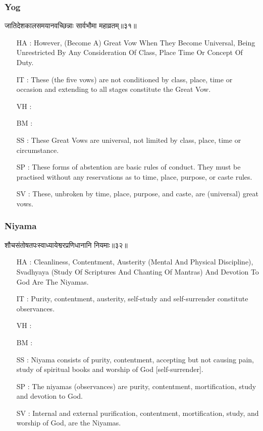 \begin{frame}[fragile]\frametitle{Yog}
\begin{sanskrit}
जातिदेशकालसमयानवच्छिन्नाः सार्वभौमा महाव्रतम्॥३१॥
\end{sanskrit}

	\begin{itemize}
	\item [HA]: However, (Become A) Great Vow When They Become Universal, Being Unrestricted By Any Consideration Of Class, Place Time Or Concept Of Duty.
	\item [IT]: These (the five vows) are not conditioned by class, place, time or occasion and extending to all stages constitute the Great Vow.
	\item [VH]: 
	\item [BM]: 
	\item [SS]: These Great Vows are universal, not limited by class, place, time or circumstance.
	\item [SP]: These forms of abstention are basic rules of conduct. They must be practised without any reservations as to time, place, purpose, or caste rules.
	\item [SV]: These, unbroken by time, place, purpose, and caste, are (universal) great vows. 
	\end{itemize}
\end{frame}



\begin{frame}[fragile]\frametitle{Niyama}
\begin{sanskrit}
शौचसंतोषतपःस्वाध्यायेश्वरप्रणिधानानि नियमाः॥३२॥
\end{sanskrit}

	\begin{itemize}
	\item [HA]: Cleanliness, Contentment, Austerity (Mental And Physical Discipline), Svadhyaya (Study Of Scriptures And Chanting Of Mantras) And Devotion To God Are The Niyamas.
	\item [IT]: Purity, contentment, austerity, self-study and self-surrender constitute observances.
	\item [VH]: 
	\item [BM]: 
	\item [SS]: Niyama consists of purity, contentment, accepting but not causing pain, study of spiritual books and worship of God [self-surrender].
	\item [SP]: The niyamas (observances) are purity, contentment, mortification, study and devotion to God.
	\item [SV]: Internal and external purification, contentment, mortification, study, and worship of God, are the Niyamas. 
	\end{itemize}
\end{frame}



